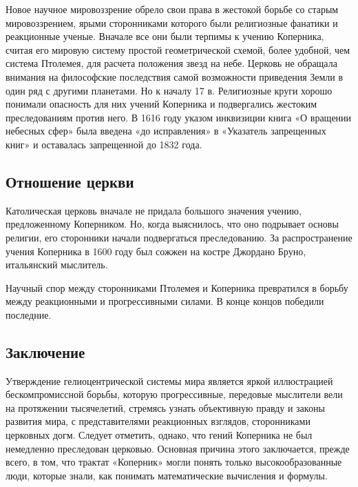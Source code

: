 \documentclass[
]{article}
\begin{document}
Новое научное мировоззрение обрело свои права в жестокой борьбе со
старым мировоззрением, ярыми сторонниками которого были религиозные
фанатики и реакционные ученые. Вначале все они были терпимы к учению
Коперника, считая его мировую систему простой геометрической схемой,
более удобной, чем система Птолемея, для расчета положения звезд на
небе. Церковь не обращала внимания на философские последствия самой
возможности приведения Земли в один ряд с другими планетами. Но к началу
17 в. Религиозные круги хорошо понимали опасность для них учений
Коперника и подвергались жестоким преследованиям против него. В 1616
году указом инквизиции книга «О вращении небесных сфер» была введена «до
исправления» в «Указатель запрещенных книг» и оставалась запрещенной до
1832 года.

\hypertarget{ux43eux442ux43dux43eux448ux435ux43dux438ux435-ux446ux435ux440ux43aux432ux438}{%
\subsection{Отношение
церкви}\label{ux43eux442ux43dux43eux448ux435ux43dux438ux435-ux446ux435ux440ux43aux432ux438}}

Католическая церковь вначале не придала большого значения учению,
предложенному Коперником. Но, когда выяснилось, что оно подрывает основы
религии, его сторонники начали подвергаться преследованию. За
распространение учения Коперника в 1600 году был сожжен на костре
Джордано Бруно, итальянский мыслитель.

Научный спор между сторонниками Птолемея и Коперника превратился в
борьбу между реакционными и прогрессивными силами. В конце концов
победили последние.

\hypertarget{ux437ux430ux43aux43bux44eux447ux435ux43dux438ux435-4}{%
\subsection{Заключение}\label{ux437ux430ux43aux43bux44eux447ux435ux43dux438ux435-4}}

Утверждение гелиоцентрической системы мира является яркой иллюстрацией
бескомпромиссной борьбы, которую прогрессивные, передовые мыслители вели
на протяжении тысячелетий, стремясь узнать объективную правду и законы
развития мира, с представителями реакционных взглядов, сторонниками
церковных догм. Следует отметить, однако, что гений Коперника не был
немедленно преследован церковью. Основная причина этого заключается,
прежде всего, в том, что трактат «Коперник» могли понять только
высокообразованные люди, которые знали, как понимать математические
вычисления и формулы.
\end{document}
